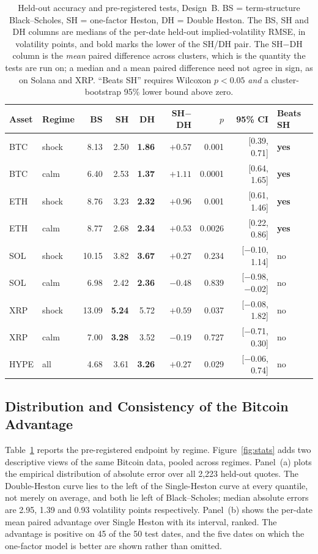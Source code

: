 \documentclass[runningheads]{llncs}
\begin{document}
\begin{table}[htbp]
\centering
\caption{Held-out accuracy and pre-registered tests, Design~B.
BS = term-structure Black--Scholes, SH = one-factor Heston, DH = Double Heston.
The BS, SH and DH columns are medians of the per-date held-out
implied-volatility RMSE, in volatility points, and bold marks the lower of the
SH/DH pair. The SH$-$DH column is the \emph{mean} paired difference across
clusters, which is the quantity the tests are run on; a median and a mean
paired difference need not agree in sign, as on Solana and XRP.
``Beats SH'' requires Wilcoxon $p<0.05$ \emph{and} a cluster-bootstrap 95\%
lower bound above zero.}
\label{tab:results}
\begin{tabular}{llrrrrrrl}
\toprule
Asset & Regime & BS & SH & DH & SH$-$DH & $p$ & 95\% CI & Beats SH \\
\midrule
BTC  & shock & 8.13 & 2.50 & \textbf{1.86} & $+0.57$ & 0.001 & [0.39, 0.71] & \textbf{yes} \\
BTC  & calm  & 6.40 & 2.53 & \textbf{1.37} & $+1.11$ & 0.0001 & [0.64, 1.65] & \textbf{yes} \\
ETH  & shock & 8.76 & 3.23 & \textbf{2.32} & $+0.96$ & 0.001 & [0.61, 1.46] & \textbf{yes} \\
ETH  & calm  & 8.77 & 2.68 & \textbf{2.34} & $+0.53$ & 0.0026 & [0.22, 0.86] & \textbf{yes} \\
SOL  & shock & 10.15 & 3.82 & \textbf{3.67} & $+0.27$ & 0.234 & [$-$0.10, 1.14] & no \\
SOL  & calm  & 6.98 & 2.42 & \textbf{2.36} & $-0.48$ & 0.839 & [$-$0.98, $-$0.02] & no \\
XRP  & shock & 13.09 & \textbf{5.24} & 5.72 & $+0.59$ & 0.037 & [$-$0.08, 1.82] & no \\
XRP  & calm  & 7.00 & \textbf{3.28} & 3.52 & $-0.19$ & 0.727 & [$-$0.71, 0.30] & no \\
HYPE & all   & 4.68 & 3.61 & \textbf{3.26} & $+0.27$ & 0.029 & [$-$0.06, 0.74] & no \\
\bottomrule
\end{tabular}
\end{table}

\subsection{Distribution and Consistency of the Bitcoin Advantage}

Table~\ref{tab:results} reports the pre-registered endpoint by regime.
Figure~\ref{fig:stats} adds two descriptive views of the same Bitcoin data,
pooled across regimes. Panel~(a) plots the empirical distribution of absolute
error over all 2{,}223 held-out quotes. The Double-Heston curve lies to the
left of the Single-Heston curve at every quantile, not merely on average, and
both lie left of Black--Scholes; median absolute errors are 2.95, 1.39 and 0.93
volatility points respectively. Panel~(b) shows the per-date mean paired
advantage over Single Heston with its interval, ranked. The advantage is
positive on 45 of the 50 test dates, and the five dates on which the one-factor
model is better are shown rather than omitted.
\end{document}
